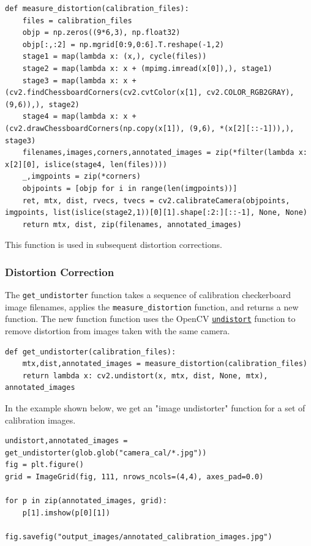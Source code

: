 \documentclass[11pt]{article}
\begin{document}
\begin{verbatim}
def measure_distortion(calibration_files):
    files = calibration_files
    objp = np.zeros((9*6,3), np.float32)
    objp[:,:2] = np.mgrid[0:9,0:6].T.reshape(-1,2)
    stage1 = map(lambda x: (x,), cycle(files))
    stage2 = map(lambda x: x + (mpimg.imread(x[0]),), stage1)
    stage3 = map(lambda x: x + (cv2.findChessboardCorners(cv2.cvtColor(x[1], cv2.COLOR_RGB2GRAY), (9,6)),), stage2)
    stage4 = map(lambda x: x + (cv2.drawChessboardCorners(np.copy(x[1]), (9,6), *(x[2][::-1])),), stage3)
    filenames,images,corners,annotated_images = zip(*filter(lambda x: x[2][0], islice(stage4, len(files))))
    _,imgpoints = zip(*corners)
    objpoints = [objp for i in range(len(imgpoints))]
    ret, mtx, dist, rvecs, tvecs = cv2.calibrateCamera(objpoints, imgpoints, list(islice(stage2,1))[0][1].shape[:2:][::-1], None, None)
    return mtx, dist, zip(filenames, annotated_images)
\end{verbatim}

This function is used in subsequent distortion corrections.

\subsubsection*{Distortion Correction}
\label{sec-1-2-2}

The \texttt{get\_undistorter} function takes a sequence of calibration
checkerboard image filenames, applies the \texttt{measure\_distortion}
function, and returns a new function.  The new function function
uses the OpenCV \href{http://docs.opencv.org/2.4/modules/imgproc/doc/geometric_transformations.html#void\%20undistort(InputArray\%20src,\%20OutputArray\%20dst,\%20InputArray\%20cameraMatrix,\%20InputArray\%20distCoeffs,\%20InputArray\%20newCameraMatrix)}{\texttt{undistort}} function to remove distortion from
images taken with the same camera.

\begin{verbatim}
def get_undistorter(calibration_files):
    mtx,dist,annotated_images = measure_distortion(calibration_files)
    return lambda x: cv2.undistort(x, mtx, dist, None, mtx), annotated_images
\end{verbatim}

In the example shown below, we get an "image undistorter"
function for a set of calibration images.

\begin{verbatim}
undistort,annotated_images = get_undistorter(glob.glob("camera_cal/*.jpg"))
fig = plt.figure()
grid = ImageGrid(fig, 111, nrows_ncols=(4,4), axes_pad=0.0)

for p in zip(annotated_images, grid):
    p[1].imshow(p[0][1])

fig.savefig("output_images/annotated_calibration_images.jpg")
\end{verbatim}
\end{document}
